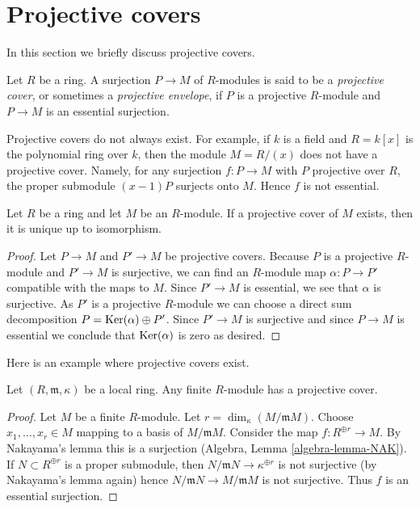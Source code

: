 \section{Projective covers}
\label{section-projective-cover}

\noindent
In this section we briefly discuss projective covers.

\begin{definition}
\label{definition-projective-cover}
Let $R$ be a ring. A surjection $P \to M$ of $R$-modules is said
to be a {\it projective cover}, or sometimes a {\it projective envelope},
if $P$ is a projective $R$-module and $P \to M$ is an essential
surjection.
\end{definition}

\noindent
Projective covers do not always exist. For example, if $k$ is a field
and $R = k[x]$ is the polynomial ring over $k$, then the module $M = R/(x)$
does not have a projective cover. Namely, for any surjection $f : P \to M$
with $P$ projective over $R$, the proper submodule $(x - 1)P$ surjects
onto $M$. Hence $f$ is not essential.

\begin{lemma}
\label{lemma-projective-cover-unique}
Let $R$ be a ring and let $M$ be an $R$-module. If a projective cover
of $M$ exists, then it is unique up to isomorphism.
\end{lemma}

\begin{proof}
Let $P \to M$ and $P' \to M$ be projective covers. Because $P$ is a
projective $R$-module and $P' \to M$ is surjective, we can find an
$R$-module map $\alpha : P \to P'$ compatible with the maps to $M$.
Since $P' \to M$ is essential, we see that $\alpha$ is surjective.
As $P'$ is a projective $R$-module we can choose a direct sum decomposition
$P = \mathop{\mathrm{Ker}}(\alpha) \oplus P'$. Since $P' \to M$ is surjective
and since $P \to M$ is essential we conclude that $\mathop{\mathrm{Ker}}(\alpha)$
is zero as desired.
\end{proof}

\noindent
Here is an example where projective covers exist.

\begin{lemma}
\label{lemma-projective-covers-local}
Let $(R, \mathfrak m, \kappa)$ be a local ring. Any finite $R$-module has
a projective cover.
\end{lemma}

\begin{proof}
Let $M$ be a finite $R$-module. Let $r = \dim_\kappa(M/\mathfrak m M)$.
Choose $x_1, \ldots, x_r \in M$ mapping to a basis of $M/\mathfrak m M$.
Consider the map $f : R^{\oplus r} \to M$. By Nakayama's lemma this is
a surjection (Algebra, Lemma \ref{algebra-lemma-NAK}). If
$N \subset R^{\oplus r}$ is a proper submodule, then
$N/\mathfrak m N \to \kappa^{\oplus r}$ is not surjective (by
Nakayama's lemma again) hence $N/\mathfrak m N \to M/\mathfrak m M$
is not surjective. Thus $f$ is an essential surjection.
\end{proof}







